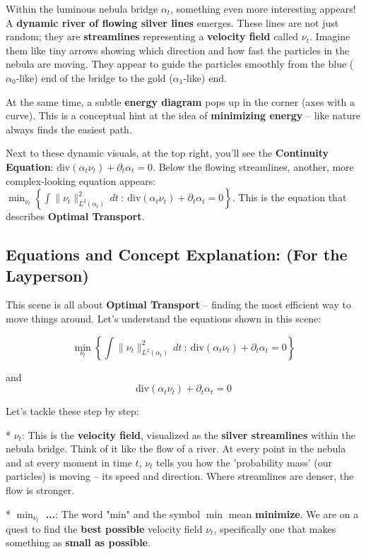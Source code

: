\documentclass{article}
\begin{document}
Within the luminous nebula bridge \( \alpha_t \), something even more interesting appears!  A \textbf{dynamic river of flowing silver lines} emerges. These lines are not just random; they are \textbf{streamlines} representing a \textbf{velocity field} called \( \nu_t \). Imagine them like tiny arrows showing which direction and how fast the particles in the nebula are moving.  They appear to guide the particles smoothly from the blue (\( \alpha_0 \)-like) end of the bridge to the gold (\( \alpha_1 \)-like) end.

At the same time, a subtle \textbf{energy diagram} pops up in the corner (axes with a curve). This is a conceptual hint at the idea of \textbf{minimizing energy} – like nature always finds the easiest path.

Next to these dynamic visuals, at the top right, you'll see the \textbf{Continuity Equation}: \( \text{div}(\alpha_t \nu_t) + \partial_t \alpha_t = 0 \). Below the flowing streamlines, another, more complex-looking equation appears: \( \min_{\nu_t} \left\{ \int \|\nu_t\|_{L^2(\alpha_t)}^2 \, dt \ : \ \text{div}(\alpha_t \nu_t) + \partial_t \alpha_t = 0 \right\} \).  This is the equation that describes \textbf{Optimal Transport}.

\subsection*{Equations and Concept Explanation: (For the Layperson)}

This scene is all about \textbf{Optimal Transport} – finding the most efficient way to move things around. Let's understand the equations shown in this scene:

\[
\min_{\nu_t} \left\{ \int \|\nu_t\|_{L^2(\alpha_t)}^2 \, dt \ : \ \text{div}(\alpha_t \nu_t) + \partial_t \alpha_t = 0 \right\}
\]

and
\[
\text{div}(\alpha_t \nu_t) + \partial_t \alpha_t = 0
\]

Let's tackle these step by step:

*   \textbf{\( \nu_t \)}: This is the \textbf{velocity field}, visualized as the \textbf{silver streamlines} within the nebula bridge. Think of it like the flow of a river. At every point in the nebula and at every moment in time \( t \), \( \nu_t \) tells you how the 'probability mass' (our particles) is moving – its speed and direction.  Where streamlines are denser, the flow is stronger.

*   \textbf{\( \min_{\nu_t} \) ...}: The word "min" and the symbol \( \min \) mean \textbf{minimize}. We are on a quest to find the \textbf{best possible} velocity field \( \nu_t \), specifically one that makes something as \textbf{small as possible}.
\end{document}
